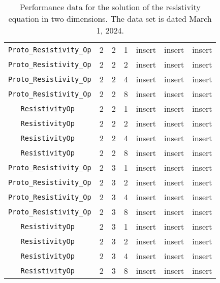 \documentclass{article}
\begin{document}
\begin{small}
\begin{table}
\begin{center}
\begin{tabular}{|c|c|c|c|c|c||c|}
\hline                                                                                
 {\tt Proto\_Resistivity\_Op} & 2 & 2   & 1    &  insert  &  insert    & insert    \\
 {\tt Proto\_Resistivity\_Op} & 2 & 2   & 2    &  insert  &  insert    & insert    \\
 {\tt Proto\_Resistivity\_Op} & 2 & 2   & 4    &  insert  &  insert    & insert    \\
 {\tt Proto\_Resistivity\_Op} & 2 & 2   & 8    &  insert  &  insert    & insert    \\
\hline                                                                                
 {\tt ResistivityOp         } & 2 & 2   & 1    &  insert  &  insert    & insert   \\
 {\tt ResistivityOp         } & 2 & 2   & 2    &  insert  &  insert    & insert   \\
 {\tt ResistivityOp         } & 2 & 2   & 4    &  insert  &  insert    & insert   \\
 {\tt ResistivityOp         } & 2 & 2   & 8    &  insert  &  insert    & insert   \\
 \hline                                                                               
                                                                                      
 {\tt Proto\_Resistivity\_Op} & 2 & 3   & 1    &  insert  &  insert    & insert    \\
 {\tt Proto\_Resistivity\_Op} & 2 & 3   & 2    &  insert  &  insert    & insert    \\
 {\tt Proto\_Resistivity\_Op} & 2 & 3   & 4    &  insert  &  insert    & insert    \\
 {\tt Proto\_Resistivity\_Op} & 2 & 3   & 8    &  insert  &  insert    & insert    \\
\hline                                                                                
 {\tt ResistivityOp         } & 2 & 3   & 1    &  insert  &  insert    & insert   \\
 {\tt ResistivityOp         } & 2 & 3   & 2    &  insert  &  insert    & insert   \\
 {\tt ResistivityOp         } & 2 & 3   & 4    &  insert  &  insert    & insert   \\
 {\tt ResistivityOp         } & 2 & 3   & 8    &  insert  &  insert    & insert   \\
 \hline
\end{tabular}
\end{center}
\label{tab::resist_2d}
\caption
    {
      Performance data for the solution of the resistivity
      equation in two dimensions.
      The data set is dated March 1, 2024.
    }
\end{table}
\end{small}
\end{document}
